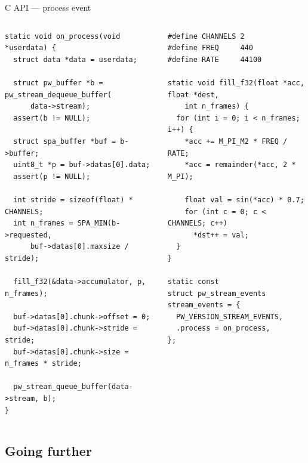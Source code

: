 \begin{frame}[fragile]{C API —  process event}
  \begin{columns}
      \begin{block}{}
        \fontsize{8}{8}\selectfont
          \begin{verbatim}
static void on_process(void *userdata) {
  struct data *data = userdata;

  struct pw_buffer *b = pw_stream_dequeue_buffer(
      data->stream);
  assert(b != NULL);

  struct spa_buffer *buf = b->buffer;
  uint8_t *p = buf->datas[0].data;
  assert(p != NULL);

  int stride = sizeof(float) * CHANNELS;
  int n_frames = SPA_MIN(b->requested,
      buf->datas[0].maxsize / stride);

  fill_f32(&data->accumulator, p, n_frames);

  buf->datas[0].chunk->offset = 0;
  buf->datas[0].chunk->stride = stride;
  buf->datas[0].chunk->size = n_frames * stride;

  pw_stream_queue_buffer(data->stream, b);
}
          \end{verbatim}
        \end{block}

      \begin{block}{}
        \fontsize{8}{8}\selectfont
          \begin{verbatim}
#define CHANNELS 2
#define FREQ     440
#define RATE     44100

static void fill_f32(float *acc, float *dest,
    int n_frames) {
  for (int i = 0; i < n_frames; i++) {
    *acc += M_PI_M2 * FREQ / RATE;
    *acc = remainder(*acc, 2 * M_PI);

    float val = sin(*acc) * 0.7;
    for (int c = 0; c < CHANNELS; c++)
      *dst++ = val;
  }
}

static const
struct pw_stream_events stream_events = {
  PW_VERSION_STREAM_EVENTS,
  .process = on_process,
};
          \end{verbatim}
        \end{block}
  \end{columns}
\end{frame}



\subsection{Going further}



